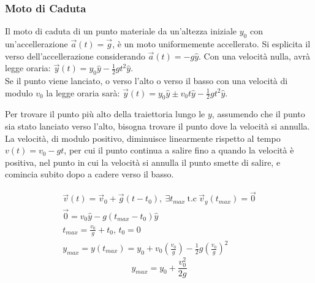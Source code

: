 \documentclass{article}
\numberwithin{equation}{subsection}
\begin{document}
\subsubsection{Moto di Caduta}


Il moto di caduta di un punto materiale da un'altezza iniziale $y_0$ 
con un'accellerazione 
$\vec{a}(t) = \vec{g}$, 
è un moto uniformemente accellerato. Si esplicita il verso dell'accellerazione considerando $\vec{a}(t)=-g\hat y$. Con una velocità nulla, avrà  
legge oraria: $\vec y(t)= y_0\hat{y} -\displaystyle\frac{1}{2}gt^{2}\hat{y}$.
\\
Se il punto viene lanciato, o verso l'alto o verso il basso
con una velocità di modulo $v_0$ la legge oraria sarà: 
$\vec y(t) = y_0\hat{y} \pm v_0t\hat{y}-\displaystyle\frac{1}{2}gt^{2}\hat{y}$.

\begin{center}\end{center}

Per trovare il punto più alto della traiettoria lungo le $y$,
assumendo che il punto sia stato lanciato verso l'alto, bisogna
trovare il punto dove la velocità si annulla. La velocità, di modulo positivo, diminuisce linearmente rispetto al tempo $v(t)=v_0-gt$, per cui il punto 
continua a salire fino a quando la velocità è positiva, nel punto in cui la velocità si annulla il punto smette di salire, e comincia subito dopo a 
cadere verso il basso. 

\begin{gather*}
    \vec{v}(t) = \vec{v}_0  + \vec{g}(t-t_0),\:\exists t_{max} \:\mbox{t.c}\:\vec{v}_y(t_{max}) = \vec{0}\\
    \vec0= v_0\hat{y} - g(t_{max}-t_0)\hat{y}\\
    t_{max} = \displaystyle\frac{v_0}{g} + t_0,\,t_0=0\\
    y_{max} = y(t_{max}) = y_0 + v_0\left(\displaystyle\frac{v_0}{g}\right) -\displaystyle\frac{1}{2}g\left(\displaystyle\frac{v_0}{g}\right)^{2}
\end{gather*}
\begin{equation}
    y_{max}=y_0 + \displaystyle\frac{v_0^{2}}{2g}
\end{equation}
\end{document}
